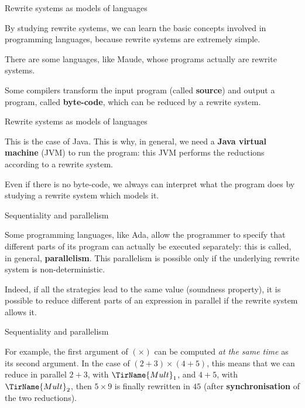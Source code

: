 \documentclass[compress,dvipdfmx]{beamer}
\newcommand{\Ada}{\textsf{Ada}\xspace}
\newcommand{\Java}{\textsf{Java}\xspace}
\newcommand{\Maude}{\textsf{Maude}\xspace}
\begin{document}
%
\begin{frame}{Rewrite systems as models of languages}

  By studying rewrite systems, we can learn the basic concepts
  involved in programming languages, because rewrite systems are
  extremely simple.

  \bigskip

  There are some languages, like \Maude, whose programs actually are
  rewrite systems.

  \bigskip

  Some compilers transform the input program (called \textbf{source})
  and output a program, called \textbf{byte-code}, which can be
  reduced by a rewrite system.

\end{frame}

%
\begin{frame}{Rewrite systems as models of languages}

  This is the case of \Java. This is why, in general, we need a
  \textbf{\Java virtual machine} (JVM) to run the program: this JVM
  performs the reductions according to a rewrite system.

  \bigskip

  Even if there is no byte-code, we always can interpret what the
  program does by studying a rewrite system which models it.

\end{frame}

%
\begin{frame}{Sequentiality and parallelism}

  Some programming languages, like \Ada, allow the programmer to
  specify that different parts of its program can actually be executed
  separately: this is called, in general, \textbf{parallelism}. This
  parallelism is possible only if the underlying rewrite system is
  non-deterministic.

  \bigskip

  Indeed, if all the strategies lead to the same value (soundness
  property), it is possible to reduce different parts of an expression
  in parallel if the rewrite system allows it.

\end{frame}

%
\begin{frame}{Sequentiality and parallelism}

  For example, the first argument of \((\times)\) can be computed
  \emph{at the same time} as its second argument. In the case of
  \((2+3) \times (4+5)\), this means that we can reduce in parallel
  \(2+3\), with \(\TirName{Mult}_1\), and \(4+5\), with
  \(\TirName{Mult}_2\), then \(5 \times 9\) is finally rewritten in
  \(45\) (after \textbf{synchronisation} of the two reductions).

\end{frame}
\end{document}
